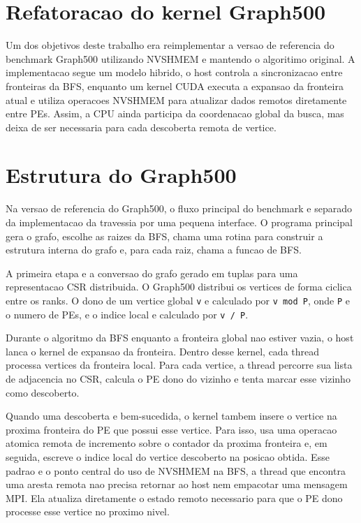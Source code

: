 \section{Refatoracao do kernel Graph500}
Um dos objetivos deste trabalho era reimplementar a versao de referencia do
benchmark Graph500 utilizando NVSHMEM e mantendo o algoritimo original. 
A implementacao segue um modelo hibrido, o host controla a sincronizacao 
entre fronteiras da BFS, enquanto um kernel 
CUDA executa a expansao da fronteira atual e utiliza operacoes NVSHMEM para atualizar 
dados remotos diretamente entre PEs. Assim, a CPU ainda participa da coordenacao global 
da busca, mas deixa de ser necessaria para cada descoberta remota de vertice.

\section{Estrutura do Graph500}
Na versao de referencia do Graph500, o fluxo principal do benchmark e separado
da implementacao da travessia por uma pequena interface. O programa principal
gera o grafo, escolhe as raizes da BFS, chama uma rotina para construir a
estrutura interna do grafo e, para cada raiz, chama a funcao de BFS.

A primeira etapa e a conversao do grafo gerado em tuplas para uma representacao
CSR distribuida. O Graph500 distribui os vertices de forma ciclica entre os
ranks. O dono de um vertice global \texttt{v} e calculado por \texttt{v mod P},
onde \texttt{P} e o numero de PEs, e o indice local e calculado por \texttt{v / P}.

Durante o algoritmo da BFS enquanto a fronteira global nao estiver vazia, 
o host lanca o kernel de expansao
da fronteira. Dentro desse kernel, cada thread processa vertices da fronteira
local. Para cada vertice, a thread percorre sua lista de adjacencia no CSR,
calcula o PE dono do vizinho e tenta marcar esse vizinho como descoberto.

Quando uma descoberta e bem-sucedida, o kernel tambem insere o vertice na
proxima fronteira do PE que possui esse vertice. Para isso, usa uma operacao
atomica remota de incremento sobre o contador da proxima fronteira e, em
seguida, escreve o indice local do vertice descoberto na posicao obtida. Esse
padrao e o ponto central do uso de NVSHMEM na BFS, a thread que encontra uma
aresta remota nao precisa retornar ao host nem empacotar uma mensagem MPI. Ela
atualiza diretamente o estado remoto necessario para que o PE dono processe esse
vertice no proximo nivel.

